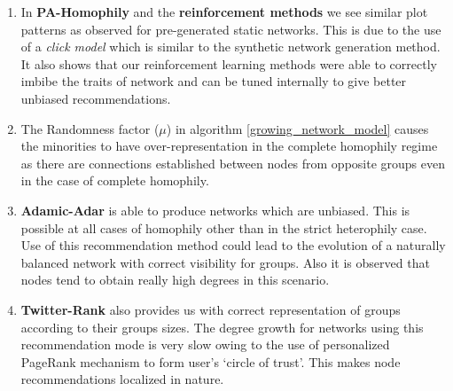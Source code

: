 \begin{enumerate}
	\item In \textbf{PA-Homophily} and the \textbf{reinforcement methods} we see similar plot patterns as observed for pre-generated static networks. This is due to the use of a \textit{click model} which is similar to the synthetic network generation method. It also shows that our reinforcement learning methods were able to correctly imbibe the traits of network and can be tuned internally to give better unbiased recommendations.
	
	\item The Randomness factor ($\mu$) in algorithm \ref{growing_network_model} causes the minorities to have over-representation in the complete homophily regime as there are connections established between nodes from opposite groups even in the case of complete homophily.
	
	\item \textbf{Adamic-Adar} is able to produce networks which are unbiased. This is possible at all cases of homophily other than in the strict heterophily case. Use of this recommendation method could lead to the evolution of a naturally balanced network with correct visibility for groups. Also it is observed that nodes tend to obtain really high degrees in this scenario.
	
	\item \textbf{Twitter-Rank} also provides us with correct representation of groups according to their groups sizes. The degree growth for networks using this recommendation mode is very slow owing to the use of personalized PageRank mechanism to form user's `circle of trust'. This makes node recommendations localized in nature.
\end{enumerate}